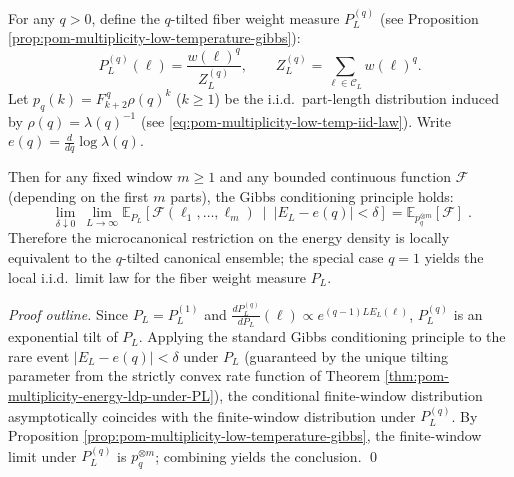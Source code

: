 \begin{theorem}\label{thm:pom-multiplicity-ensemble-equivalence}
For any \(q>0\), define the \(q\)-tilted fiber weight measure \(P_L^{(q)}\) (see Proposition \ref{prop:pom-multiplicity-low-temperature-gibbs}):
\[
P_L^{(q)}(\boldsymbol{\ell})=\frac{w(\boldsymbol{\ell})^{q}}{Z_L^{(q)}},
\qquad
Z_L^{(q)}=\sum_{\boldsymbol{\ell}\in\mathcal{C}_L}w(\boldsymbol{\ell})^{q}.
\]
Let \(p_q(k)=F_{k+2}^{\,q}\rho(q)^k\) (\(k\ge 1\)) be the i.i.d.\ part-length distribution induced by \(\rho(q)=\lambda(q)^{-1}\) (see \eqref{eq:pom-multiplicity-low-temp-iid-law}).
Write \(e(q)=\frac{d}{dq}\log\lambda(q)\).
\par
Then for any fixed window \(m\ge 1\) and any bounded continuous function \(\mathcal{F}\) (depending on the first \(m\) parts), the Gibbs conditioning principle holds:
\[
\boxed{\;
\lim_{\delta\downarrow 0}\ \lim_{L\to\infty}
\mathbb{E}_{P_L}\!\left[\mathcal{F}(\ell_1,\dots,\ell_m)\ \middle|\ |E_L-e(q)|<\delta\right]
=\mathbb{E}_{p_q^{\otimes m}}[\mathcal{F}]\; } .
\]
Therefore the microcanonical restriction on the energy density is locally equivalent to the \(q\)-tilted canonical ensemble; the special case \(q=1\) yields the local i.i.d.\ limit law for the fiber weight measure \(P_L\).
\end{theorem}
\begin{proof}[Proof outline]
Since \(P_L=P_L^{(1)}\) and
\(
\frac{dP_L^{(q)}}{dP_L}(\boldsymbol{\ell})\propto e^{(q-1)LE_L(\boldsymbol{\ell})}
\),
\(P_L^{(q)}\) is an exponential tilt of \(P_L\).
Applying the standard Gibbs conditioning principle to the rare event \(|E_L-e(q)|<\delta\) under \(P_L\) (guaranteed by the unique tilting parameter from the strictly convex rate function of Theorem \ref{thm:pom-multiplicity-energy-ldp-under-PL}), the conditional finite-window distribution asymptotically coincides with the finite-window distribution under \(P_L^{(q)}\).
By Proposition \ref{prop:pom-multiplicity-low-temperature-gibbs}, the finite-window limit under \(P_L^{(q)}\) is \(p_q^{\otimes m}\); combining yields the conclusion. \qed
\end{proof}
\endinput


